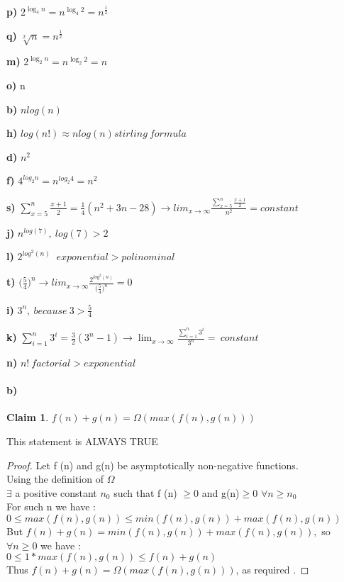 \documentclass[10 pt]{article}
\newtheorem{claim}[theorem]{Claim}
\begin{document}
\textbf{p)} $ 2^{\log_{4}n} = n^{\log_{4}2} = n^\frac{1}{2} $

\textbf{q)} $ \sqrt[2]{n} = n^\frac{1}{2}$ 

\textbf{m)} $2^{\log_{2}n} = n^{\log_{2}2} = n   $

\textbf{o)} n

\textbf{b)} $n log(n)$

\textbf{h)} $log(n!) \approx nlog(n) stirling \ formula $

\textbf{d)} $n^2$

\textbf{f)} $ 4^{log_2n} = n ^{log_2 4} = n^2$

\textbf{s)} $\sum_{x=5}^{n} \frac{x+1}{2} =  \frac{1}{4} (n^2 + 3n - 28) \rightarrow  lim_{x\to\infty} \frac{\sum_{x=5}^{n} \frac{x+1}{2}}{n^2}  = constant$

\textbf{j)} $n^{log(7)} , \ log(7) > 2 $

\textbf{l)} $2^{log^2(n)}$ $\ exponential >   polinominal $

\textbf{t)} $ \big (\frac{5}{4}\big)^n \rightarrow  lim_{x\to\infty} \frac{2^{log^2(n)}}{ \big (\frac{5}{4}\big)^n} = 0  $

\textbf{i)} $3^n ,  \   because \ 3 > \frac{5}{4}$

\textbf{k)} $\sum_{i=1}^{n} 3^i = \frac{3}{2}(3^n - 1) \rightarrow  \lim_{x\to\infty} \frac{\sum_{i=1}^{n}3^i}{3^n} = \ constant$

\textbf{n)} $n! \ factorial > exponential $




\paragraph{b)}
\begin {claim}
 $f(n)+g(n)=\Omega (max(f(n),g(n))) $ 
\end {claim}
This statement is  ALWAYS TRUE
\begin {proof}
Let f (n) and g(n) be asymptotically non-negative functions.\\
Using the definition of $ \Omega $\\
$\exists $  a positive constant $n_0$ such that  f (n) $\geq 0$  and g(n)$ \geq 0$  $ \forall n   \geq n_0$ \\
For such n we have :\\
$ 0 \leq  max( f (n),g(n)) \leq  min( f (n), g (n)) + max( f (n), g (n))$ \\
But $ f(n) + g(n) = min( f (n), g (n)) + max( f (n), g (n)), $ so $  \forall n   \geq 0 $ we have : \\
$0 \leq 1* max(f(n),g(n)) \leq  f(n)+ g(n)$ \\
Thus $f(n)+g(n)=\Omega (max(f(n),g(n))) $, as required .
\end {proof}
\end{document}
